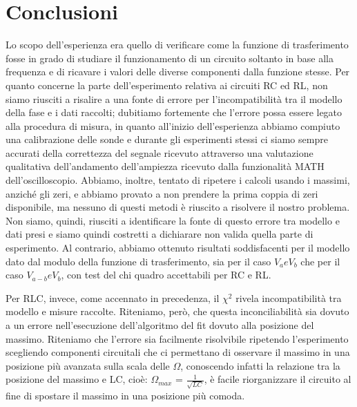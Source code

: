 \section{Conclusioni}
Lo scopo dell’esperienza era quello di verificare come la funzione di trasferimento fosse in grado di studiare il funzionamento di un circuito soltanto in base alla frequenza e di ricavare i valori delle diverse componenti dalla funzione stesse.
Per quanto concerne la parte dell'esperimento relativa ai circuiti RC ed RL, non siamo riusciti a risalire a una fonte di errore per l’incompatibilità tra il modello della fase e i dati raccolti; dubitiamo fortemente che l’errore possa essere legato alla 
procedura di misura, in quanto all’inizio dell’esperienza abbiamo compiuto una calibrazione delle sonde e durante gli esperimenti stessi ci siamo sempre accurati della correttezza del segnale ricevuto attraverso una valutazione qualitativa dell’andamento dell’ampiezza ricevuto dalla funzionalità MATH dell’oscilloscopio. Abbiamo, inoltre, tentato di ripetere i calcoli usando i massimi, anziché gli zeri, e abbiamo provato a non prendere la 
prima coppia di zeri disponibile, ma nessuno di questi metodi è riuscito a risolvere il nostro problema. Non siamo, quindi, riusciti a identificare la fonte di questo errore tra modello e dati 
presi e siamo quindi costretti a dichiarare non valida quella parte di esperimento. Al contrario, abbiamo ottenuto risultati soddisfacenti per il modello dato dal modulo della funzione 
di trasferimento, sia per il caso $V_{a} e V_{b}$ che per il caso $V_{a-b} e V_{b}$, con test del chi quadro 
accettabili per RC e RL.

Per RLC, invece, come accennato in precedenza, il $\chi ^{2}$ rivela incompatibilità tra modello e misure raccolte. Riteniamo, però, che questa inconciliabilità sia dovuto a un errore nell’esecuzione dell’algoritmo del fit dovuto alla posizione del massimo. 
Riteniamo che l’errore sia facilmente risolvibile ripetendo l’esperimento scegliendo componenti circuitali che ci permettano di osservare il massimo in una posizione più avanzata sulla scala delle $\Omega$, conoscendo infatti la relazione tra la posizione del massimo e LC, cioè: $\Omega_{max}$ = $\frac{1}{\sqrt{LC}}$, è facile riorganizzare il circuito al 
fine di spostare il massimo in una posizione più comoda.